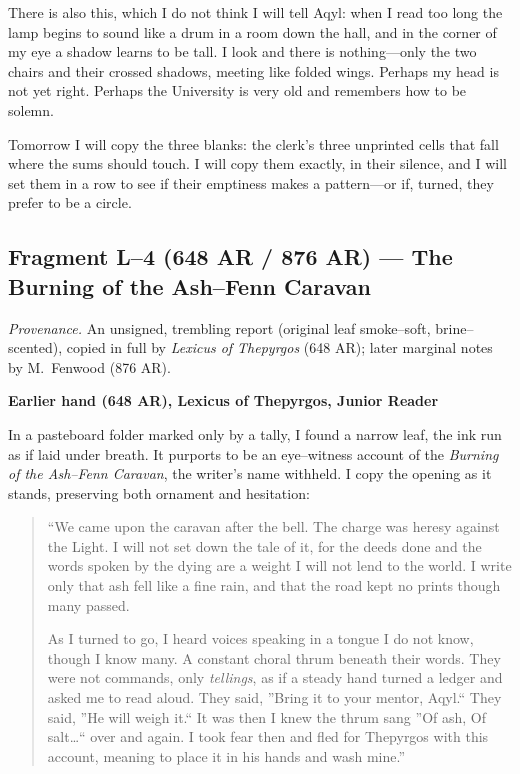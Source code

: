 \documentclass[11pt]{article}
\numberwithin{equation}{section} %
\theoremstyle{plain} %
\theoremstyle{definition} %
\theoremstyle{remark} %
\begin{document}
There is also this, which I do not think I will tell Aqyl: when I read too long the lamp begins to sound like a drum in a room down the hall, and in the corner of my eye a shadow learns to be tall. I look and there is nothing---only the two chairs and their crossed shadows, meeting like folded wings. Perhaps my head is not yet right. Perhaps the University is very old and remembers how to be solemn.

Tomorrow I will copy the three blanks: the clerk's three unprinted cells that fall where the sums should touch. I will copy them exactly, in their silence, and I will set them in a row to see if their emptiness makes a pattern---or if, turned, they prefer to be a circle.

\subsection{Fragment L--4 (648 AR / 876 AR) --- The Burning of the Ash--Fenn Caravan}
\label{frag:l4}

\noindent\textit{Provenance.} An unsigned, trembling report (original leaf smoke--soft, brine--scented), copied in full by \textit{Lexicus of Thepyrgos} (648 AR); later marginal notes by M.\ Fenwood (876 AR).

\medskip
\noindent\textbf{Earlier hand (648 AR), Lexicus of Thepyrgos, Junior Reader}

In a pasteboard folder marked only by a tally, I found a narrow leaf, the ink run as if laid under breath. It purports to be an eye--witness account of the \textit{Burning of the Ash--Fenn Caravan}, the writer's name withheld. I copy the opening as it stands, preserving both ornament and hesitation:

\begin{quote}\small
``We came upon the caravan after the bell. The charge was heresy against the Light. I will not set down the tale of it, for the deeds done and the words spoken by the dying are a weight I will not lend to the world. I write only that ash fell like a fine rain, and that the road kept no prints though many passed.

As I turned to go, I heard voices speaking in a tongue I do not know, though I know many. A constant choral thrum beneath their words. They were not commands, only \emph{tellings}, as if a steady hand turned a ledger and asked me to read aloud. They said, ''Bring it to your mentor, Aqyl.`` They said, ''He will weigh it.`` It was then I knew the thrum sang ''Of ash, Of salt\dots`` over and again. I took fear then and fled for Thepyrgos with this account, meaning to place it in his hands and wash mine.''
\end{quote}
\end{document}

